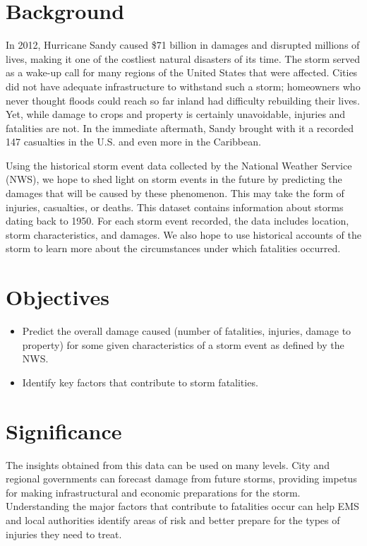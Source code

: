 \documentclass[a4paper,11pt]{texMemo}
\begin{document}
\maketitle

\section{Background}

In 2012, Hurricane Sandy caused \$71 billion in damages and disrupted millions of lives, making it one of the costliest natural disasters of its time. The storm served as a wake-up call for many regions of the United States that were affected. Cities did not have adequate infrastructure to withstand such a storm; homeowners who never thought floods could reach so far inland had difficulty rebuilding their lives. Yet, while damage to crops and property is certainly unavoidable, injuries and fatalities are not. In the immediate aftermath, Sandy brought with it a recorded 147 casualties in the U.S. and even more in the Caribbean. 

Using the historical storm event data collected by the National Weather Service (NWS), we hope to shed light on storm events in the future by predicting the damages that will be caused by these phenomenon. This may take the form of injuries, casualties, or deaths. This dataset contains information about storms dating back to 1950. For each storm event recorded, the data includes location, storm characteristics, and damages. We also hope to use historical accounts of the storm to learn more about the circumstances under which fatalities occurred.

\section{Objectives}
\begin{itemize}
    \item Predict the overall damage caused (number of fatalities, injuries, damage to property) for some given characteristics of a storm event as defined by the NWS.
    \item Identify key factors that contribute to storm fatalities.
\end{itemize}

\section{Significance}

The insights obtained from this data can be used on many levels. City and regional governments can forecast damage from future storms, providing impetus for making infrastructural and economic preparations for the storm. Understanding the major factors that contribute to fatalities occur can help EMS and local authorities identify areas of risk and better prepare for the types of injuries they need to treat. 
\end{document}
